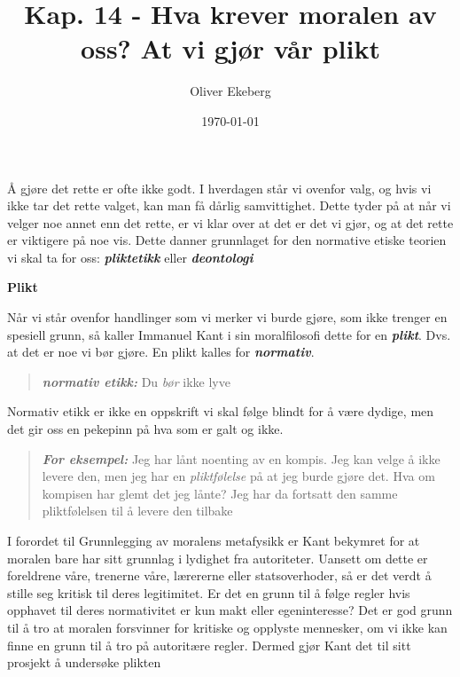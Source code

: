 \documentclass[11pt, a4paper]{article}
\title{Kap. 14 - Hva krever moralen av oss? At vi gjør vår plikt}
\author{Oliver Ekeberg}
\date{\today}
\newenvironment{sectionbox}[1][]{%
    \begin{sectionboxinner}
    \textbf{\large #1}
    \vspace{1pt}
    \newline
}{%
    \end{sectionboxinner}
}
\begin{document}
\maketitle

\tableofcontents

\begin{flushleft}
    Å gjøre det rette er ofte ikke godt. I hverdagen står vi ovenfor valg, og hvis vi ikke tar det rette valget, kan man få dårlig samvittighet. Dette tyder på at når vi velger noe annet enn det rette, er vi klar over at det er det vi gjør, og at det rette er viktigere på noe vis. Dette danner grunnlaget for den normative etiske teorien vi skal ta for oss: \textbf{\textit{pliktetikk}} eller \textbf{\textit{deontologi}}
\end{flushleft}

\begin{sectionbox}[Plikt]
    \begin{flushleft}
    Når vi står ovenfor handlinger som vi merker vi burde gjøre, som ikke trenger en spesiell grunn, så kaller Immanuel Kant i sin moralfilosofi dette for en \textbf{\textit{plikt}}. Dvs. at det er noe vi bør gjøre. En plikt kalles for \textbf{\textit{normativ}}. 
    \begin{quote}
        \textbf{\textit{normativ etikk:}} Du \textit{bør} ikke lyve
    \end{quote}
    Normativ etikk er ikke en oppskrift vi skal følge blindt for å være dydige, men det gir oss en pekepinn på hva som er galt og ikke.

    \begin{quote}
        \textbf{\textit{For eksempel:}} Jeg har lånt noenting av en kompis. Jeg kan velge å ikke levere den, men jeg har en \textit{pliktfølelse} på at jeg burde gjøre det. Hva om kompisen har glemt det jeg lånte? Jeg har da fortsatt den samme pliktfølelsen til å levere den tilbake
    \end{quote}

    I forordet til Grunnlegging av moralens metafysikk er Kant bekymret for at moralen bare har sitt grunnlag i lydighet fra autoriteter. Uansett om dette er foreldrene våre, trenerne våre, lærererne eller statsoverhoder, så er det verdt å stille seg kritisk til deres legitimitet. Er det en grunn til å følge regler hvis opphavet til deres normativitet er kun makt eller egeninteresse? Det er god grunn til å tro at moralen forsvinner for kritiske og opplyste mennesker, om vi ikke kan finne en grunn til å tro på autoritære regler. Dermed gjør Kant det til sitt prosjekt å undersøke plikten


\end{flushleft}
\end{sectionbox}
\end{document}
